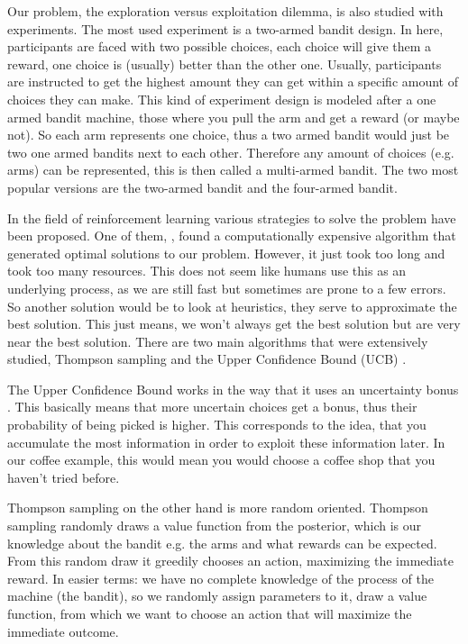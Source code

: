 Our problem, the exploration versus exploitation dilemma, is also studied with experiments. The most used experiment is a two-armed bandit design. In here, participants are faced with two possible choices, each choice will give them a reward, one choice is (usually) better than the other one. Usually, participants are instructed to get the highest amount they can get within a specific amount of choices they can make.  This kind of experiment design is modeled after a one armed bandit machine, those where you pull the arm and get a reward (or maybe not). So each arm represents one choice, thus a two armed bandit would just be two one armed bandits next to each other. Therefore any amount of choices (e.g. arms) can be represented, this is then called a multi-armed bandit. The two most popular versions are the two-armed bandit and the four-armed bandit. 

In the field of reinforcement learning various strategies to solve the problem have been proposed.  One of them, \citep{gittins1979bandit}, found a computationally expensive algorithm that generated optimal solutions to our problem. However, it just took too long and took too many resources. %
This does not seem like humans use this as an underlying process, as we are still fast but sometimes are prone to a few errors. So another solution would be to look at heuristics, they serve to approximate the best solution. This just means, we won’t always get the best solution but are very near the best solution. There are two main algorithms that were extensively studied, Thompson sampling \citep{thompson1933likelihood} and the Upper Confidence Bound (UCB) \citep{auer2002finite}.

The Upper Confidence Bound \citep{auer2002finite} works in the way that it uses an uncertainty bonus \citep{srinivas2009gaussian}. This basically means that more uncertain choices get a bonus, thus their probability of being picked is higher. This corresponds to the idea, that you accumulate the most information in order to exploit these information later. In our coffee example, this would mean you would choose a coffee shop that you haven’t tried before. 

Thompson sampling on the other hand is more random oriented. Thompson sampling randomly draws a value function from the posterior, which is our knowledge about the bandit e.g. the arms and what rewards can be expected. From this random draw it greedily chooses an action, maximizing the immediate reward. In easier terms: we have no complete knowledge of the process of the machine (the bandit), so we randomly assign parameters to it, draw a value function, from which we want to choose an action that will maximize the immediate outcome.

